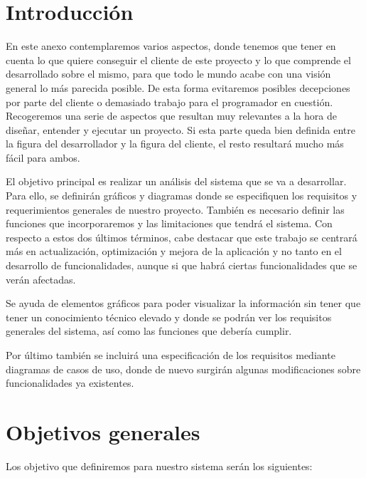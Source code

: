 
\section{Introducción}

En este anexo contemplaremos varios aspectos, donde tenemos que tener en cuenta lo que quiere conseguir el cliente de este proyecto y lo que comprende el desarrollado sobre el mismo, para que todo le mundo acabe con una visión general lo más parecida posible. De esta forma evitaremos posibles decepciones por parte del cliente o demasiado trabajo para el programador en cuestión. Recogeremos una serie de aspectos que resultan muy relevantes a la hora de diseñar, entender y ejecutar un proyecto. Si esta parte queda bien definida entre la figura del desarrollador y la figura del cliente, el resto resultará mucho más fácil para ambos.

El objetivo principal es realizar un análisis del sistema que se va a desarrollar. Para ello, se definirán gráficos y diagramas donde se especifiquen los requisitos y requerimientos generales de nuestro proyecto. También es necesario definir las funciones que incorporaremos y las limitaciones que tendrá el sistema. Con respecto a estos dos últimos términos, cabe destacar que este trabajo se centrará más en actualización, optimización y mejora de la aplicación y no tanto en el desarrollo de funcionalidades, aunque si que habrá ciertas funcionalidades que se verán afectadas.

Se ayuda de elementos gráficos para poder visualizar la información sin tener que tener un conocimiento técnico elevado y donde se podrán ver los requisitos generales del sistema, así como las funciones que debería cumplir.

Por último también se incluirá una especificación de los requisitos mediante diagramas de casos de uso, donde de nuevo surgirán algunas modificaciones sobre funcionalidades ya existentes.

\section{Objetivos generales}

Los objetivo que definiremos para nuestro sistema serán los siguientes:

